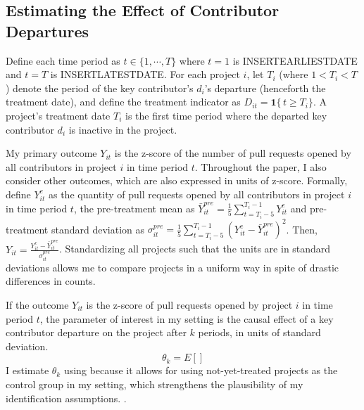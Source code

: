 \documentclass[12pt,notitlepage]{article}
\begin{document}
\subsection{Estimating the Effect of Contributor Departures}
Define each time period as $t \in \{1, \cdots, T\}$ where $t=1$ is INSERTEARLIESTDATE and $t=T$ is INSERTLATESTDATE. For each project $i$, let $T_i$ (where $1 < T_i < T$) denote the period of the key contributor’s $d_i$'s departure (henceforth the treatment date), and define the treatment indicator as $D_{it} = \mathbf{1}\{\,t \ge T_i\}$. A project's treatment date $T_i$ is the first time period where the departed key contributor $d_i$ is inactive in the project. 

My primary outcome $Y_{it}$ is the z-score of the number of pull requests opened by all contributors in project $i$ in time period $t$. Throughout the paper, I also consider other outcomes, which are also expressed in units of z-score. Formally, define $Y_{it}^c$ as the quantity of pull requests opened by all contributors in project $i$ in time period $t$, the pre-treatment mean as $\bar{Y}_{it}^{pre} = \frac{1}{5}\sum_{t=T_i-5}^{T_i-1} Y_{it}^c$ and pre-treatment standard deviation as $\sigma_{it}^{pre} = \frac{1}{5}\sum_{t=T_i-5}^{T_i-1} \left (Y_{it}^c - \bar{Y}_{it}^{pre} \right)^2$. Then, $Y_{it} = \frac{Y_{it}^c - \bar{Y}_{it}^{pre}}{\sigma_{it}^{pre}}$. Standardizing all projects such that the units are in standard deviations allows me to compare projects in a uniform way in spite of drastic differences in counts.  

If the outcome $Y_{it}$ is the z-score of pull requests opened by project $i$ in time period $t$, the parameter of interest in my setting is the causal effect of a key contributor departure on the project after $k$ periods, in units of standard deviation. 
\begin{equation}
    \theta_{k} = E[]
\end{equation}
I estimate $\theta_k$ using \cite{callaway_difference--differences_2021} because it allows for using not-yet-treated projects as the control group in my setting, which strengthens the plausibility of my identification assumptions. . 
\end{document}
